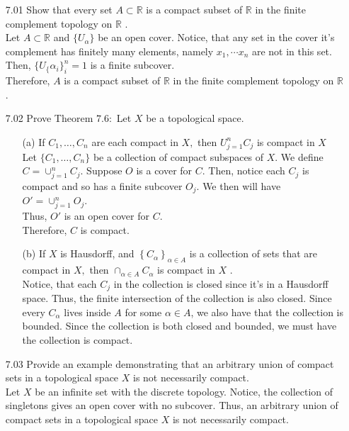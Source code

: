\documentclass[12pt]{article}
\newcommand{\R}{\mathbb{R}}
\begin{document}
	\pagestyle{fancy}  
	\lfoot{} \cfoot{} \rfoot{}
	
	\begin{enumerate}
		\item[7.01] Show that every set $A \subset \R$ is a compact subset of $\mathbb { R }$ in the finite complement topology on $\mathbb { R }$ .\\
		Let $ A \subset \R $ and $ \{U_\alpha\} $ be an open cover. Notice, that any set in the cover it's complement has finitely many elements, namely $ x_1,\cdots x_n $	are not in this set. Then, $ \{U_\{\alpha_i\}^n_i=1 $ is a finite subcover.\\
		Therefore, $ A $ is a compact subset of $ \R $ in the finite complement topology on $ \R $.	
		\item[7.02] Prove Theorem $7.6 :$ Let $X$ be a topological space.
		\begin{enumerate}
			\item[(a)] If $C _ { 1 } , \ldots , C _ { n }$ are each compact in $X ,$ then $U _ { j = 1 } ^ { n } C _ { j }$ is compact in $X$\\
			Let $ \{C_1,\ldots,C_n\} $ be a collection of compact subspaces of $ X $. We define $ C = \cup^n_{j=1} C_j$. Suppose $ O $ is a cover for $ C $. Then, notice each $ C_j $ is compact and so has a finite subcover $ O_j $. We then will have $ O' = \cup^n_{j=1} O_j $. \\
		    Thus, $ O' $ is an open cover for $ C $.\\
			Therefore, $ C $ is compact.
			\item[(b)] If $X$ is Hausdorff, and $\left\{ C _ { \alpha } \right\} _ { \alpha \in A }$ is a collection of sets that are compact in
			$X ,$ then $\cap _ { \alpha \in A } C _ { \alpha }$ is compact in $X$ .\\
			Notice, that each $ C_j $ in the collection is closed since it's in a Hausdorff space. Thus, the finite intersection of the collection is also closed. Since every $ C_\alpha $ lives inside $ A $ for some $ \alpha\in A $, we also have that the collection is bounded. Since the collection is both closed and bounded, we must have the collection is compact.
		\end{enumerate}
		
		\item[7.03] Provide an example demonstrating that an arbitrary union of compact sets in a
		topological space $X$ is not necessarily compact.\\
		Let $ X $ be an infinite set with the discrete topology. Notice, the collection of singletons gives an open cover with no subcover. Thus, an arbitrary union of compact sets in a topological space $X$ is not necessarily compact.
		

\end{enumerate}
\end{document}
